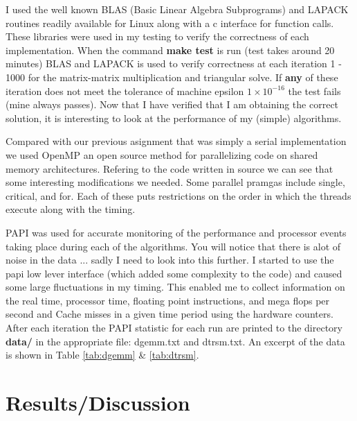 \documentclass[a4paper,12pt]{article}
\begin{document}
I used the well known BLAS (Basic Linear Algebra Subprograms) and LAPACK routines readily available for Linux along with a c interface for function calls. These libraries were used in my testing to verify the correctness of each implementation. When the command \textbf{make test} is run (test takes around 20 minutes) BLAS and LAPACK is used to verify correctness at each iteration 1 - 1000 for the matrix-matrix multiplication and triangular solve. If \textbf{any} of these iteration does not meet the tolerance of machine epsilon $1 \times 10^{-16}$ the test fails (mine always passes). Now that I have verified that I am obtaining the correct solution, it is interesting to look at the performance of my (simple) algorithms. 

Compared with our previous asignment that was simply a serial implementation we used OpenMP an open source method for parallelizing code on shared memory architectures. Refering to the code written in source we can see that some interesting modifications we needed. Some parallel pramgas include single, critical, and for. Each of these puts restrictions on the order in which the threads execute along with the timing.

PAPI was used for accurate monitoring of the performance and processor events taking place during each of the algorithms. You will notice that there is alot of noise in the data ... sadly I need to look into this further. I started to use the papi low lever interface (which added some complexity to the code) and caused some large fluctuations in my timing. This enabled me to collect information on the real time, processor time, floating point instructions, and mega flops per second and Cache misses in a given time period using the hardware counters. After each iteration the PAPI statistic for each run are printed to the directory \textbf{data/} in the appropriate file: dgemm.txt and dtrsm.txt. An excerpt of the data is shown in Table \ref{tab:dgemm} \& \ref{tab:dtrsm}.

\section{Results/Discussion}
\end{document}
